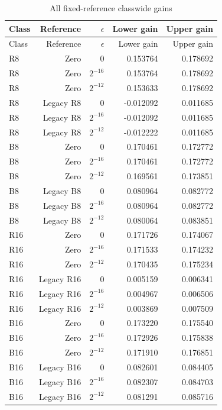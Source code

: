 {\footnotesize\setlength{\tabcolsep}{3pt}
\begin{longtable}{lrrrr}
\caption{All fixed-reference classwide gains}\label{tab:own-gains82}\\
\hline
Class & Reference & $\epsilon$ & Lower gain & Upper gain \\
\hline
\endfirsthead
\hline
Class & Reference & $\epsilon$ & Lower gain & Upper gain \\
\hline
\endhead
R8 & Zero & $0$ & 0.153764 & 0.178692 \\
R8 & Zero & $2^{-16}$ & 0.153764 & 0.178692 \\
R8 & Zero & $2^{-12}$ & 0.153633 & 0.178692 \\
R8 & Legacy R8 & $0$ & -0.012092 & 0.011685 \\
R8 & Legacy R8 & $2^{-16}$ & -0.012092 & 0.011685 \\
R8 & Legacy R8 & $2^{-12}$ & -0.012222 & 0.011685 \\
B8 & Zero & $0$ & 0.170461 & 0.172772 \\
B8 & Zero & $2^{-16}$ & 0.170461 & 0.172772 \\
B8 & Zero & $2^{-12}$ & 0.169561 & 0.173851 \\
B8 & Legacy B8 & $0$ & 0.080964 & 0.082772 \\
B8 & Legacy B8 & $2^{-16}$ & 0.080964 & 0.082772 \\
B8 & Legacy B8 & $2^{-12}$ & 0.080064 & 0.083851 \\
R16 & Zero & $0$ & 0.171726 & 0.174067 \\
R16 & Zero & $2^{-16}$ & 0.171533 & 0.174232 \\
R16 & Zero & $2^{-12}$ & 0.170435 & 0.175234 \\
R16 & Legacy R16 & $0$ & 0.005159 & 0.006341 \\
R16 & Legacy R16 & $2^{-16}$ & 0.004967 & 0.006506 \\
R16 & Legacy R16 & $2^{-12}$ & 0.003869 & 0.007509 \\
B16 & Zero & $0$ & 0.173220 & 0.175540 \\
B16 & Zero & $2^{-16}$ & 0.172926 & 0.175838 \\
B16 & Zero & $2^{-12}$ & 0.171910 & 0.176851 \\
B16 & Legacy B16 & $0$ & 0.082601 & 0.084405 \\
B16 & Legacy B16 & $2^{-16}$ & 0.082307 & 0.084703 \\
B16 & Legacy B16 & $2^{-12}$ & 0.081291 & 0.085716 \\
\hline\end{longtable}}
